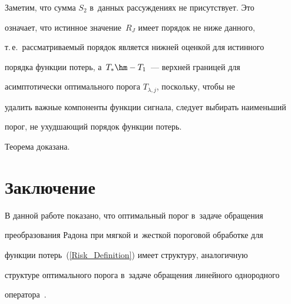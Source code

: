 Заметим, что сумма $S_2$ в~данных рассуждениях не присутствует. Это 


означает, что истинное значение~$R_J$ имеет порядок не ниже данного, 


т.\,е.\ рассматриваемый порядок является нижней оценкой для истинного 


порядка функции потерь, а~$T_*\hm-T_1$~--- верхней границей для 


асимптотически оптимального порога $T_{\lambda,j}$, поскольку, чтобы не 


удалить важные компоненты функции сигнала, следует выбирать наименьший 


порог, не ухудшающий порядок функции потерь.





Теорема доказана.





\section{Заключение}





В данной работе показано, что оптимальный порог в~задаче обращения 


преобразования Радона при мягкой и~жесткой пороговой обработке для 


функции потерь~(\ref{Risk_Definition}) имеет структуру, аналогичную 


структуре оптимального порога в~задаче обращения линейного однородного 


оператора~\cite{KS18}.





